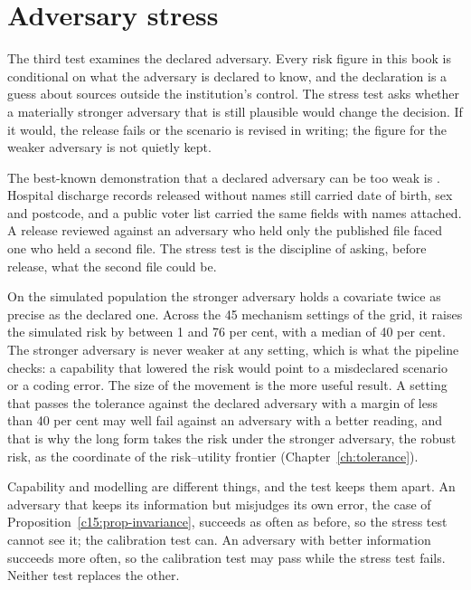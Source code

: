 \section{Adversary stress}

The third test examines the declared adversary. Every risk figure in this book is
conditional on what the adversary is declared to know, and the declaration is a
guess about sources outside the institution's control. The stress test asks
whether a materially stronger adversary that is still plausible would change the
decision. If it would, the release fails or the scenario is revised in writing; the
figure for the weaker adversary is not quietly kept.

The best-known demonstration that a declared adversary can be too weak is
\citet{sweeney2000}. Hospital discharge records released without names still
carried date of birth, sex and postcode, and a public voter list carried the same
fields with names attached. A release reviewed against an adversary who held only
the published file faced one who held a second file. The stress test is the
discipline of asking, before release, what the second file could be.

On the simulated population the stronger adversary holds a covariate twice as
precise as the declared one. %
Across the 45 mechanism settings of the grid, it raises the simulated risk by between
1 and 76 per cent, with a median of 40 per cent.
The stronger adversary is never weaker at any setting, which is what the pipeline
checks: a capability that lowered the risk would point to a misdeclared scenario or
a coding error. The size of the movement is the more useful result. A setting that
passes the tolerance against the declared adversary with a margin of less than 40
per cent may well fail against an adversary with a better reading, and that is why
the long form takes the risk under the stronger adversary, the robust risk, as the
coordinate of the risk--utility frontier (Chapter~\ref{ch:tolerance}).

Capability and modelling are different things, and the test keeps them apart. An
adversary that keeps its information but misjudges its own error, the case of
Proposition~\ref{c15:prop-invariance}, succeeds as often as before, so the stress
test cannot see it; the calibration test can. An adversary with better information
succeeds more often, so the calibration test may pass while the stress test fails.
Neither test replaces the other.

